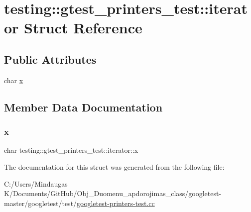\hypertarget{structtesting_1_1gtest__printers__test_1_1iterator}{}\section{testing\+::gtest\+\_\+printers\+\_\+test\+::iterator Struct Reference}
\label{structtesting_1_1gtest__printers__test_1_1iterator}
\subsection*{Public Attributes}
\begin{DoxyCompactItemize}
\item 
char \mbox{\hyperlink{structtesting_1_1gtest__printers__test_1_1iterator_a3d4d056077d3b3869259bdfd60a0778f}{x}}
\end{DoxyCompactItemize}


\subsection{Member Data Documentation}
\mbox{\label{structtesting_1_1gtest__printers__test_1_1iterator_a3d4d056077d3b3869259bdfd60a0778f}} 
\subsubsection{\texorpdfstring{x}{x}}
{\footnotesize\ttfamily char testing\+::gtest\+\_\+printers\+\_\+test\+::iterator\+::x}



The documentation for this struct was generated from the following file\+:\begin{DoxyCompactItemize}
\item 
C\+:/\+Users/\+Mindaugas K/\+Documents/\+Git\+Hub/\+Obj\+\_\+\+Duomenu\+\_\+apdorojimas\+\_\+class/googletest-\/master/googletest/test/\mbox{\hyperlink{googletest-master_2googletest_2test_2googletest-printers-test_8cc}{googletest-\/printers-\/test.\+cc}}\end{DoxyCompactItemize}
